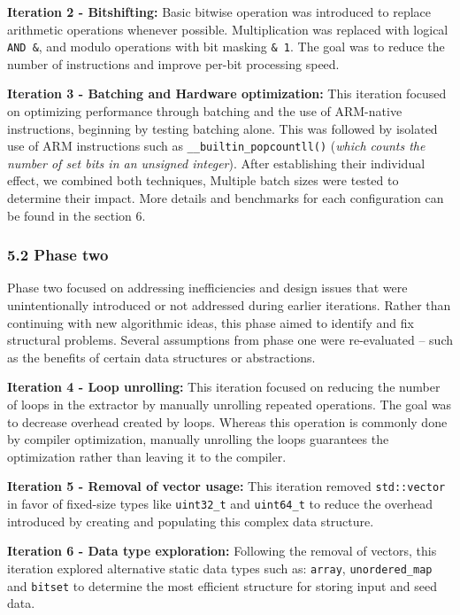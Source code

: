 \textbf{Iteration 2 - Bitshifting:} Basic bitwise operation was introduced to replace arithmetic operations whenever possible. Multiplication was replaced with logical \texttt{AND\ \&}, and modulo operations with bit masking \texttt{\&\ 1}. The goal was to reduce the number of instructions and improve per-bit processing speed.

\textbf{Iteration 3 - Batching and Hardware optimization:} This iteration focused on optimizing performance through batching and the use of ARM-native instructions, beginning by testing batching alone. This was followed by isolated use of ARM instructions such as \texttt{\_\_builtin\_popcountll()} (\emph{which counts the number of set bits in an unsigned integer}). After establishing their individual effect, we combined both techniques, Multiple batch sizes were tested to determine their impact. More details and benchmarks for each configuration can be found in the section 6.

\subsubsection{5.2 Phase two}\label{phase-two}

Phase two focused on addressing inefficiencies and design issues that were unintentionally introduced or not addressed during earlier iterations. Rather than continuing with new algorithmic ideas, this phase aimed to identify and fix structural problems. Several assumptions from phase one were re-evaluated -- such as the benefits of certain data structures or abstractions.

\textbf{Iteration 4 - Loop unrolling:} This iteration focused on reducing the number of loops in the extractor by manually unrolling repeated operations. The goal was to decrease overhead created by loops. Whereas this operation is commonly done by compiler optimization, manually unrolling the loops guarantees the optimization rather than leaving it to the compiler.

\textbf{Iteration 5 - Removal of vector usage:} This iteration removed \texttt{std::vector} in favor of fixed-size types like \texttt{uint32\_t} and \texttt{uint64\_t} to reduce the overhead introduced by creating and populating this complex data structure.

\textbf{Iteration 6 - Data type exploration:} Following the removal of vectors, this iteration explored alternative static data types such as: \texttt{array}, \texttt{unordered\_map} and \texttt{bitset} to determine the most efficient structure for storing input and seed data.

